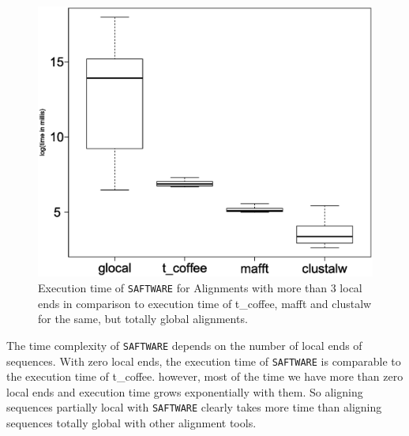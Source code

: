 \documentclass[a4paper,10pt]{article}
\newcommand{\TODO}[1]{\begingroup\color{red}#1\endgroup}
\newcommand{\SAFTWARE}{\TODO{\texttt{SAFTWARE}}}
\begin{document}
{\begin{figure}
  \begin{center}
    \includegraphics[width=1\columnwidth]{times_bigger3_boxplot.eps}
  \end{center}
  \label{fig:manyLoc}
  \caption{Execution time of \SAFTWARE{} for Alignments with more than 3 local ends in comparison to execution time of t\_coffee, mafft and clustalw for the same, but totally global alignments.}
\end{figure}
The time complexity of \SAFTWARE{} depends on the number of local ends of sequences. With zero local ends, the execution time of \SAFTWARE{} is comparable to the execution time of t\_coffee. however, most of the time we have more than zero local ends and execution time grows exponentially with them. So aligning sequences partially local with \SAFTWARE{} clearly takes more time than aligning sequences totally global with other alignment tools.  
  
}
\end{document}
